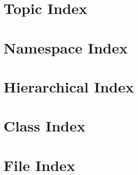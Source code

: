 \documentclass[twoside]{book}
\newcommand{\+}{\discretionary{\mbox{\scriptsize$\hookleftarrow$}}{}{}}
\begin{document}
















\chapter{Topic Index}

\chapter{Namespace Index}

\chapter{Hierarchical Index}

\chapter{Class Index}

\chapter{File Index}

\end{document}
